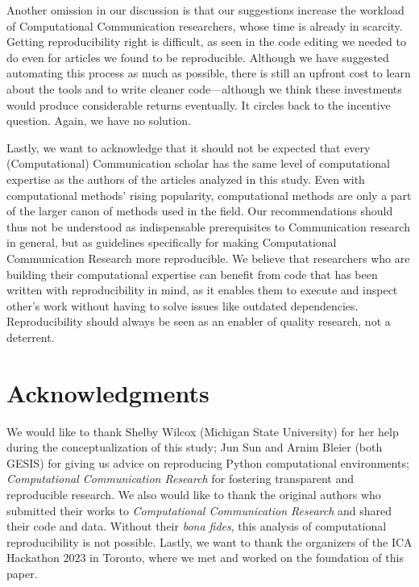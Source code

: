 Another omission in our discussion is that our suggestions increase the workload of Computational Communication researchers, whose time is already in scarcity. Getting reproducibility right is difficult, as seen in the code editing we needed to do even for articles we found to be reproducible. Although we have suggested automating this process as much as possible, there is still an upfront cost to learn about the tools and to write cleaner code---although we think these investments would produce considerable returns eventually. It circles back to the incentive question. Again, we have no solution.

Lastly, we want to acknowledge that it should not be expected that every (Computational) Communication scholar has the same level of computational expertise as the authors of the articles analyzed in this study. Even with computational methods' rising popularity, computational methods are only a part of the larger canon of methods used in the field. Our recommendations should thus not be understood as indispensable prerequisites to Communication research in general, but as guidelines specifically for making Computational Communication Research more reproducible. We believe that researchers who are building their computational expertise can benefit from code that has been written with reproducibility in mind, as it enables them to execute and inspect other's work without having to solve issues like outdated dependencies. Reproducibility should always be seen as an enabler of quality research, not a deterrent.

\section{Acknowledgments}

We would like to thank Shelby Wilcox (Michigan State University) for her help during the conceptualization of this study; Jun Sun and Arnim Bleier (both GESIS) for giving us advice on reproducing Python computational environments; 
\textit{Computational Communication Research} for fostering transparent and reproducible research. We also would like to thank the original authors who submitted their works to \textit{Computational Communication Research} and shared their code and data. Without their \textit{bona fides}, this analysis of computational reproducibility is not possible. Lastly, we want to thank the organizers of the ICA Hackathon 2023 in Toronto, where we met and worked on the foundation of this paper.
